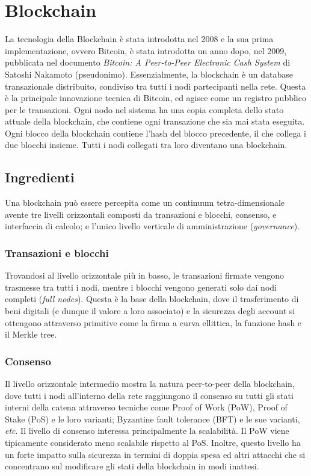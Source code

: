 \section{Blockchain}
La tecnologia della Blockchain è stata introdotta nel 2008 e la sua prima implementazione, ovvero Bitcoin, è stata introdotta un anno dopo, nel 2009, pubblicata nel documento \emph{Bitcoin: A Peer-to-Peer Electronic Cash System} \cite{c21} di Satoshi Nakamoto (pseudonimo). Essenzialmente, la blockchain è un database transazionale distribuito, condiviso tra tutti i nodi partecipanti nella rete. Questa è la principale innovazione tecnica di Bitcoin, ed agisce come un registro pubblico per le transazioni. Ogni nodo nel sistema ha una copia completa dello stato attuale della blockchain, che contiene ogni transazione che sia mai stata eseguita. Ogni blocco della blockchain contiene l'hash del blocco precedente, il che collega i due blocchi insieme. Tutti i nodi collegati tra loro diventano una blockchain.

\subsection{Ingredienti}
Una blockchain può essere percepita come un continuum tetra-dimensionale avente tre livelli orizzontali composti da transazioni e blocchi, consenso, e interfaccia di calcolo; e l'unico livello verticale di amministrazione (\emph{governance}).

\subsubsection{Transazioni e blocchi}
Trovandosi al livello orizzontale più in basso, le transazioni firmate vengono trasmesse tra tutti i nodi, mentre i blocchi vengono generati solo dai nodi completi (\emph{full nodes}). Questa è la base della blockchain, dove il trasferimento di beni digitali (e dunque il valore a loro associato) e la sicurezza degli account si ottengono attraverso primitive come la firma a curva ellittica, la funzione hash e il Merkle tree.

\subsubsection{Consenso}
Il livello orizzontale intermedio mostra la natura peer-to-peer della blockchain, dove tutti i nodi all'interno della rete raggiungono il consenso su tutti gli stati interni della catena attraverso tecniche come Proof of Work (PoW), Proof of Stake (PoS) e le loro varianti; Byzantine fault tolerance (BFT) e le sue varianti, \emph{etc}. Il livello di consenso interessa principalmente la scalabilità. Il PoW viene tipicamente considerato meno scalabile rispetto al PoS. Inoltre, questo livello ha un forte impatto sulla sicurezza in termini di doppia spesa ed altri attacchi che si concentrano sul modificare gli stati della blockchain in modi inattesi.

